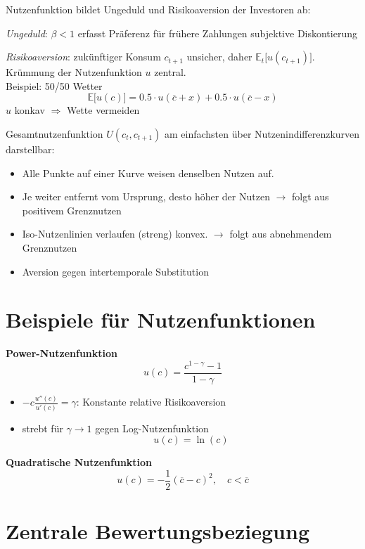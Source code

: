 \documentclass[12pt]{extreport} %
\theoremstyle{named}
\theoremstyle{nnamed}
\theoremstyle{itshape}
\theoremstyle{normal}
\begin{document}
Nutzenfunktion bildet Ungeduld und Risikoaversion der Investoren ab:

\begin{description}
	\item \textit{Ungeduld}: $\beta < 1$ erfasst Präferenz für frühere Zahlungen subjektive Diskontierung
	\item \textit{Risikoaversion}: zukünftiger Konsum $c_{t+1}$ unsicher, daher $\mathbb{E}_t \big[ u(c_{t+1}) \big]$. Krümmung der Nutzenfunktion $u$ zentral. ~\\
		Beispiel: 50/50 Wetter
		$$ \mathbb{E} \big[ u(c) \big] = 0.5 \cdot u ( \overline{c} + x ) + 0.5 \cdot u ( \overline{c} - x ) $$
		$u$ konkav $\Rightarrow$ Wette vermeiden
\end{description} %

Gesamtnutzenfunktion $U(c_t, c_{t+1})$ am einfachsten über Nutzenindifferenzkurven darstellbar: %

\begin{itemize}
	\item Alle Punkte auf einer Kurve weisen denselben Nutzen auf.
	\item Je weiter entfernt vom Ursprung, desto höher der Nutzen $\rightarrow$ folgt aus positivem Grenznutzen
	\item Iso-Nutzenlinien verlaufen (streng) konvex. $\rightarrow$ folgt aus abnehmendem Grenznutzen
	\item Aversion gegen intertemporale Substitution
\end{itemize}

\section{Beispiele für Nutzenfunktionen}

\textbf{Power-Nutzenfunktion}
	$$ u(c) = \frac{c^{1-\gamma} - 1}{1 - \gamma} $$
\begin{itemize}
	\item $- c \frac{u''(c)}{u'(c)} = \gamma$: Konstante relative Risikoaversion
	\item strebt für $\gamma \rightarrow 1$ gegen Log-Nutzenfunktion
		$$ u(c) = \ln(c) $$
\end{itemize}

\textbf{Quadratische Nutzenfunktion}
	$$ u(c) = - \frac{1}{2} \left( \overline{c} - c \right)^2, \quad c < \overline{c} $$

\section{Zentrale Bewertungsbeziegung}
\end{document}
